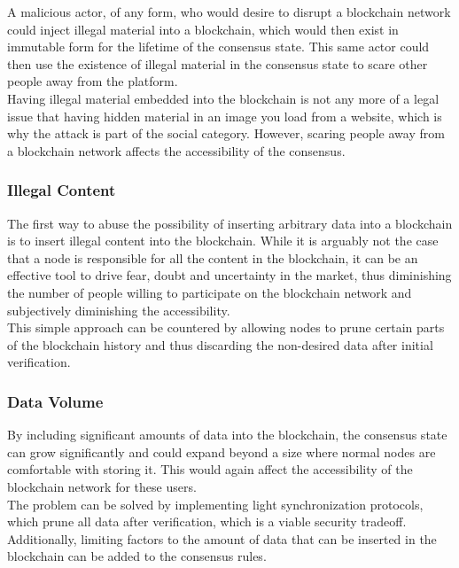 \documentclass[12pt,a4paper]{article}
\begin{document}
A malicious actor, of any form, who would desire to disrupt a blockchain network could inject illegal material into a blockchain, which would then exist in immutable form for the lifetime of the consensus state. This same actor could then use the existence of illegal material in the consensus state to scare other people away from the platform.\\

Having illegal material embedded into the blockchain is not any more of a legal issue that having hidden material in an image you load from a website, which is why the attack is part of the social category. However, scaring people away from a blockchain network affects the accessibility of the consensus.\\

\subsubsection{Illegal Content}

The first way to abuse the possibility of inserting arbitrary data into a blockchain is to insert illegal content into the blockchain. While it is arguably not the case that a node is responsible for all the content in the blockchain, it can be an effective tool to drive fear, doubt and uncertainty in the market, thus diminishing the number of people willing to participate on the blockchain network and subjectively diminishing the accessibility.\\

This simple approach can be countered by allowing nodes to prune certain parts of the blockchain history and thus discarding the non-desired data after initial verification.\\

\subsubsection{Data Volume}

By including significant amounts of data into the blockchain, the consensus state can grow significantly and could expand beyond a size where normal nodes are comfortable with storing it. This would again affect the accessibility of the blockchain network for these users.\\

The problem can be solved by implementing light synchronization protocols, which prune all data after verification, which is a viable security tradeoff. Additionally, limiting factors to the amount of data that can be inserted in the blockchain can be added to the consensus rules.\\
\end{document}
